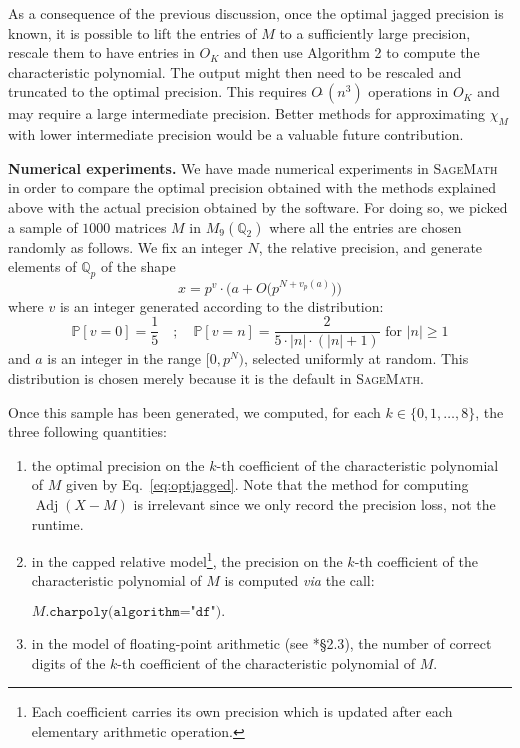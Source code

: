 \documentclass{sig-alternate-05-2015}
\DeclareMathOperator{\adj}{Adj}
\newcommand{\Q}{\mathbb Q}
\newcommand{\softO}{O\tilde{~}}
\begin{document}
\begin{rem} \label{rem:lift_for_optimal}
As a consequence of the previous discussion, once the optimal jagged 
precision is known, it is possible to lift the entries of $M$ to a sufficiently
large precision, rescale them to have entries in $O_K$
and then use Algorithm 2 to
compute the characteristic polynomial.
The output might then need to be rescaled and
 truncated to the optimal precision. 
This requires $\softO(n^3)$ operations in $O_K$ 
and may require a large intermediate precision.
Better methods for approximating $\chi_M$ with
lower intermediate precision would be a valuable
future contribution.
\end{rem}

\medskip

\noindent
{\bf Numerical experiments.}
We have made numerical experiments in \textsc{SageMath}~\cite{sage}
in order to compare the optimal precision obtained with the methods
explained above with the actual precision obtained by the software.
For doing so, we picked a sample of $1000$ matrices $M$ in 
$M_9(\Q_2)$ where all the entries are chosen randomly as follows.
We fix an integer $N$, the relative precision, and generate elements of $\Q_p$ of the shape
\[
x = p^v \cdot \big(a + O\big(p^{N+v_p(a)}\big)\big)
\]
where $v$ is an integer generated according to the distribution:
\[
\mathbb P [v = 0] = \frac 1 5 \quad ; \quad
\mathbb P [v = n] = \frac 2 {5\cdot |n| \cdot (|n|+1)} \text{ for }
|n| \geq 1
\]
and $a$ is an integer in the range $[0, p^N)$, selected uniformly at random.
This distribution is chosen merely because it is the default in \textsc{SageMath}.

Once this sample has been generated, we computed, for each $k \in \{0, 
1, \ldots, 8\}$, the three following quantities:

\vspace{-2mm}

\begin{enumerate}[$\bullet$]
\renewcommand{\itemsep}{0pt}
\item the optimal precision on the $k$-th coefficient of the 
characteristic polynomial of $M$ given by Eq.~\eqref{eq:optjagged}.
Note that the method for computing $\adj(X-M)$ is irrelevant
since we only record the precision loss, not the runtime.
\item in the capped relative model\footnote{Each 
coefficient carries its own precision which is updated after each 
elementary arithmetic operation.},
the precision on the $k$-th coefficient of the 
characteristic polynomial of $M$ is computed \emph{via} the call:

\hfill$M\texttt{.charpoly(algorithm="df")}.$\hfill\null

\item in the model of floating-point arithmetic (see 
\cite{caruso:17a}*{\S 2.3}), the number of correct digits of the 
$k$-th coefficient of the characteristic polynomial of $M$.
\end{enumerate}
\end{document}
